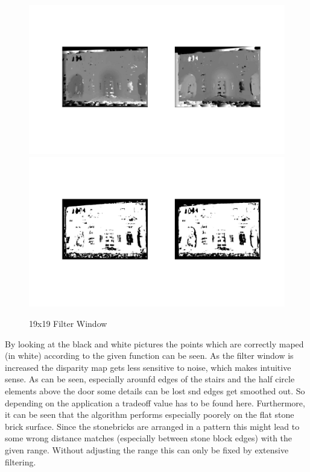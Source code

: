 \documentclass[12pt]{article}
\begin{document}
\begin{figure}[H]
	\centering
	\includegraphics[width=1.1\textwidth]{dc19_1.jpg}
	\includegraphics[width=1.1\textwidth]{dc19_2.jpg}
	\caption{19x19 Filter Window}
	\label{fig1}
\end{figure}
\vspace{5mm}

By looking at the black and white pictures the points which are correctly maped (in white) according to the given function can be seen. As the filter window is increased the disparity map gets less sensitive to noise, which makes intuitive sense. As can be seen, especially arounfd edges of the stairs and the half circle elements above the door some details can be lost snd edges get smoothed out. So depending on the application a tradeoff value has to be found here.
\newline
Furthermore, it can be seen that the algorithm performs especially poorely on the flat stone brick surface. Since the stonebricks are arranged in a pattern this might lead to some wrong distance matches (especially between stone block edges) with the given range. Without adjusting the range this can only be fixed by extensive filtering.  
\end{document}
